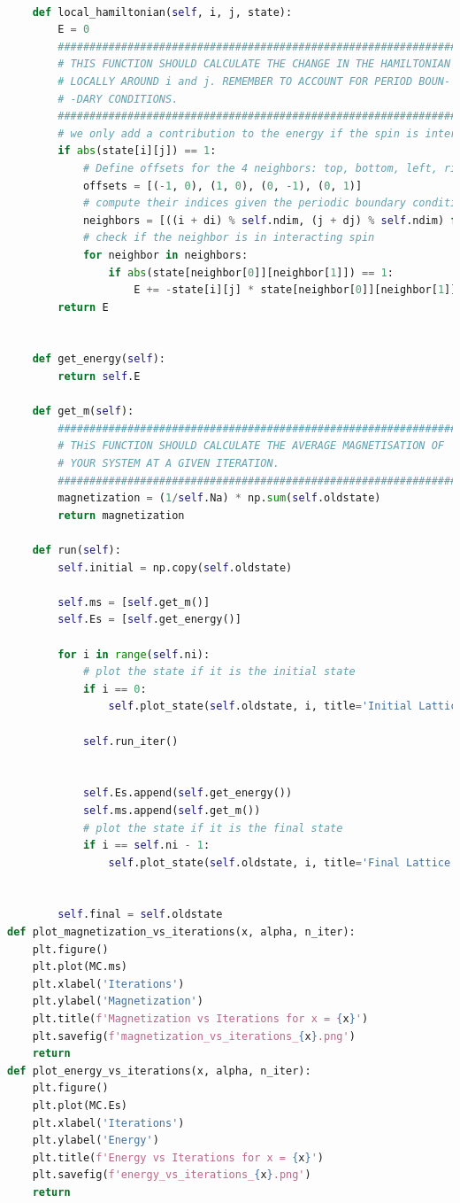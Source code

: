 \documentclass[12pt]{article}
\begin{document}
\begin{lstlisting}[language=Python]
    
    def local_hamiltonian(self, i, j, state):
        E = 0
        ################################################################
        # THIS FUNCTION SHOULD CALCULATE THE CHANGE IN THE HAMILTONIAN #
        # LOCALLY AROUND i and j. REMEMBER TO ACCOUNT FOR PERIOD BOUN- #
        # -DARY CONDITIONS.                                            #
        ################################################################
        # we only add a contribution to the energy if the spin is interacting
        if abs(state[i][j]) == 1:
            # Define offsets for the 4 neighbors: top, bottom, left, right, 
            offsets = [(-1, 0), (1, 0), (0, -1), (0, 1)]
            # compute their indices given the periodic boundary conditions, which means taking mod self.ndim
            neighbors = [((i + di) % self.ndim, (j + dj) % self.ndim) for di, dj in offsets]
            # check if the neighbor is in interacting spin
            for neighbor in neighbors:
                if abs(state[neighbor[0]][neighbor[1]]) == 1:
                    E += -state[i][j] * state[neighbor[0]][neighbor[1]]       
        return E
    

    def get_energy(self):
        return self.E

    def get_m(self):
        ################################################################
        # THiS FUNCTION SHOULD CALCULATE THE AVERAGE MAGNETISATION OF  #
        # YOUR SYSTEM AT A GIVEN ITERATION.                            #
        ################################################################
        magnetization = (1/self.Na) * np.sum(self.oldstate)
        return magnetization
    
    def run(self):
        self.initial = np.copy(self.oldstate)

        self.ms = [self.get_m()]
        self.Es = [self.get_energy()]

        for i in range(self.ni):
            # plot the state if it is the initial state
            if i == 0:
                self.plot_state(self.oldstate, i, title='Initial Lattice State')

            self.run_iter()

            
            self.Es.append(self.get_energy())
            self.ms.append(self.get_m())
            # plot the state if it is the final state
            if i == self.ni - 1:
                self.plot_state(self.oldstate, i, title='Final Lattice State')
                
        
        self.final = self.oldstate
def plot_magnetization_vs_iterations(x, alpha, n_iter):
    plt.figure()
    plt.plot(MC.ms)
    plt.xlabel('Iterations')
    plt.ylabel('Magnetization')
    plt.title(f'Magnetization vs Iterations for x = {x}')
    plt.savefig(f'magnetization_vs_iterations_{x}.png')
    return
def plot_energy_vs_iterations(x, alpha, n_iter):
    plt.figure()
    plt.plot(MC.Es)
    plt.xlabel('Iterations')
    plt.ylabel('Energy')
    plt.title(f'Energy vs Iterations for x = {x}')
    plt.savefig(f'energy_vs_iterations_{x}.png')
    return


\end{lstlisting}
\end{document}
